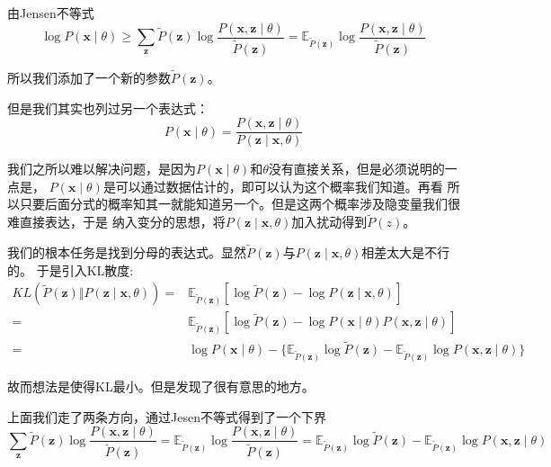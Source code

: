 \documentclass{article}
\begin{document}
        由Jensen不等式
        \[\log P(\boldsymbol{x}\mid\theta)\ge\sum_{\boldsymbol{z}}\widetilde{P}(\boldsymbol{z})\log \frac{P(\boldsymbol{x},\boldsymbol{z}\mid\theta)}{\widetilde{P}(\boldsymbol{z})}=\mathbb{E}_{\widetilde{P}(\boldsymbol{z})}\log \frac{P(\boldsymbol{x},\boldsymbol{z}\mid\theta)}{\widetilde{P}(\boldsymbol{z})}\]

        所以我们添加了一个新的参数$\widetilde{P}(\boldsymbol{z})$。


        但是我们其实也列过另一个表达式：
        \[P(\boldsymbol{x}\mid\theta)=\frac{P(\boldsymbol{x},\boldsymbol{z}\mid\theta)}{P(\boldsymbol{z}\mid\boldsymbol{x},\theta)}\]

        我们之所以难以解决问题，是因为$P(\boldsymbol{x}\mid\theta)$和$\theta$没有直接关系，但是必须说明的一点是，
        $P(\boldsymbol{x}\mid\theta)$是可以通过数据估计的，即可以认为这个概率我们知道。再看
        所以只要后面分式的概率知其一就能知道另一个。但是这两个概率涉及隐变量我们很难直接表达，于是
        纳入变分的思想，将$P(\boldsymbol{z}\mid\boldsymbol{x},\theta)$加入扰动得到$\widetilde{P}(z)$。

        我们的根本任务是找到分母的表达式。显然$\widetilde{P}(\boldsymbol{z})$与$P(\boldsymbol{z}\mid\boldsymbol{x},\theta)$相差太大是不行的。
        于是引入KL散度:
        \begin{align*}
            KL(\widetilde{P}(\boldsymbol{z})\Vert P(\boldsymbol{z}\mid\boldsymbol{x},\theta))=&\mathbb{E}_{\widetilde{P}(\boldsymbol{z})}[\log \widetilde{P}(\boldsymbol{z})-\log P(\boldsymbol{z}\mid\boldsymbol{x},\theta) ]\\
            =&\mathbb{E}_{\widetilde{P}(\boldsymbol{z})}[\log \widetilde{P}(\boldsymbol{z})-\log P(\boldsymbol{x}\mid\theta)P(\boldsymbol{x},\boldsymbol{z}\mid\theta) ]\\
            =&\log P(\boldsymbol{x}\mid\theta)-\{\mathbb{E}_{\widetilde{P}(\boldsymbol{z})}\log \widetilde{P}(\boldsymbol{z})-\mathbb{E}_{\widetilde{P}(\boldsymbol{z})}\log P(\boldsymbol{x},\boldsymbol{z}\mid\theta)\}
        \end{align*}

        故而想法是使得KL最小。但是发现了很有意思的地方。

        上面我们走了两条方向，通过Jesen不等式得到了一个下界
        \[\sum_{\boldsymbol{z}}\widetilde{P}(\boldsymbol{z})\log \frac{P(\boldsymbol{x},\boldsymbol{z}\mid\theta)}{\widetilde{P}(\boldsymbol{z})}=\mathbb{E}_{\widetilde{P}(\boldsymbol{z})}\log \frac{P(\boldsymbol{x},\boldsymbol{z}\mid\theta)}{\widetilde{P}(\boldsymbol{z})}=\mathbb{E}_{\widetilde{P}(\boldsymbol{z})}\log \widetilde{P}(\boldsymbol{z})-\mathbb{E}_{\widetilde{P}(\boldsymbol{z})}\log P(\boldsymbol{x},\boldsymbol{z}\mid\theta)\]
\end{document}
